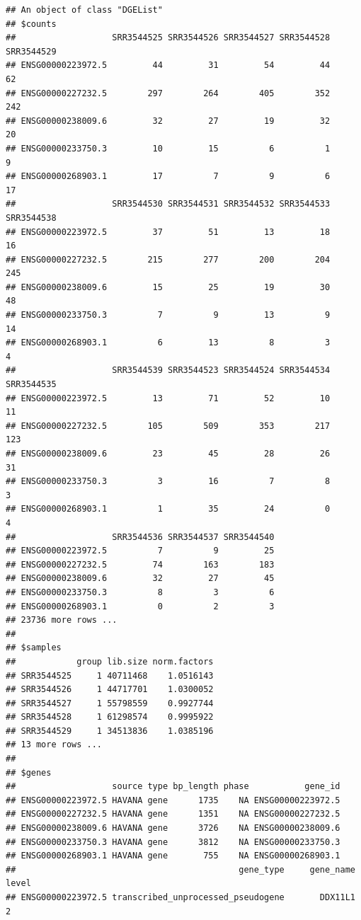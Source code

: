 \documentclass[
]{article}
\begin{document}
\begin{verbatim}
## An object of class "DGEList"
## $counts
##                   SRR3544525 SRR3544526 SRR3544527 SRR3544528 SRR3544529
## ENSG00000223972.5         44         31         54         44         62
## ENSG00000227232.5        297        264        405        352        242
## ENSG00000238009.6         32         27         19         32         20
## ENSG00000233750.3         10         15          6          1          9
## ENSG00000268903.1         17          7          9          6         17
##                   SRR3544530 SRR3544531 SRR3544532 SRR3544533 SRR3544538
## ENSG00000223972.5         37         51         13         18         16
## ENSG00000227232.5        215        277        200        204        245
## ENSG00000238009.6         15         25         19         30         48
## ENSG00000233750.3          7          9         13          9         14
## ENSG00000268903.1          6         13          8          3          4
##                   SRR3544539 SRR3544523 SRR3544524 SRR3544534 SRR3544535
## ENSG00000223972.5         13         71         52         10         11
## ENSG00000227232.5        105        509        353        217        123
## ENSG00000238009.6         23         45         28         26         31
## ENSG00000233750.3          3         16          7          8          3
## ENSG00000268903.1          1         35         24          0          4
##                   SRR3544536 SRR3544537 SRR3544540
## ENSG00000223972.5          7          9         25
## ENSG00000227232.5         74        163        183
## ENSG00000238009.6         32         27         45
## ENSG00000233750.3          8          3          6
## ENSG00000268903.1          0          2          3
## 23736 more rows ...
## 
## $samples
##            group lib.size norm.factors
## SRR3544525     1 40711468    1.0516143
## SRR3544526     1 44717701    1.0300052
## SRR3544527     1 55798559    0.9927744
## SRR3544528     1 61298574    0.9995922
## SRR3544529     1 34513836    1.0385196
## 13 more rows ...
## 
## $genes
##                   source type bp_length phase           gene_id
## ENSG00000223972.5 HAVANA gene      1735    NA ENSG00000223972.5
## ENSG00000227232.5 HAVANA gene      1351    NA ENSG00000227232.5
## ENSG00000238009.6 HAVANA gene      3726    NA ENSG00000238009.6
## ENSG00000233750.3 HAVANA gene      3812    NA ENSG00000233750.3
## ENSG00000268903.1 HAVANA gene       755    NA ENSG00000268903.1
##                                            gene_type     gene_name level
## ENSG00000223972.5 transcribed_unprocessed_pseudogene       DDX11L1     2

\end{verbatim}
\end{document}
